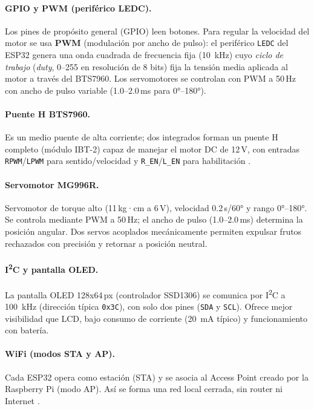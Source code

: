\documentclass[12pt]{catolica_proyectos}
\begin{document}
\paragraph{GPIO y PWM (periférico LEDC).} Los pines de propósito general (GPIO) leen botones. Para regular la velocidad del motor se usa \textbf{PWM} (modulación por ancho de pulso): el periférico \texttt{LEDC} del ESP32 genera una onda cuadrada de frecuencia fija (\SI{10}{\kilo\hertz}) cuyo \emph{ciclo de trabajo} (\emph{duty}, 0--255 en resolución de 8 bits) fija la tensión media aplicada al motor a través del BTS7960. Los servomotores se controlan con PWM a 50\,Hz con ancho de pulso variable (1.0--2.0\,ms para 0°--180°).

\paragraph{Puente H BTS7960.} Es un medio puente de alta corriente; dos integrados forman un puente H completo (módulo IBT-2) capaz de manejar el motor DC de 12\,V, con entradas \texttt{RPWM}/\texttt{LPWM} para sentido/velocidad y \texttt{R\_EN}/\texttt{L\_EN} para habilitación \cite{infineon2013bts7960}.

\paragraph{Servomotor MG996R.} Servomotor de torque alto (11\,kg·cm a 6\,V), velocidad 0.2\,s/60° y rango 0°--180°. Se controla mediante PWM a 50\,Hz; el ancho de pulso (1.0--2.0\,ms) determina la posición angular. Dos servos acoplados mecánicamente permiten expulsar frutos rechazados con precisión y retornar a posición neutral.

\paragraph{I\textsuperscript{2}C y pantalla OLED.} La pantalla OLED 128x64\,px (controlador SSD1306) se comunica por I\textsuperscript{2}C a \SI{100}{\kilo\hertz} (dirección típica \texttt{0x3C}), con solo dos pines (\texttt{SDA} y \texttt{SCL}). Ofrece mejor visibilidad que LCD, bajo consumo de corriente (\SI{20}{\milli\ampere} típico) y funcionamiento con batería.

\paragraph{WiFi (modos STA y AP).} Cada ESP32 opera como estación (STA) y se asocia al Access Point creado por la Raspberry Pi (modo AP). Así se forma una red local cerrada, sin router ni Internet \cite{ieee2020wifi}.
\end{document}
